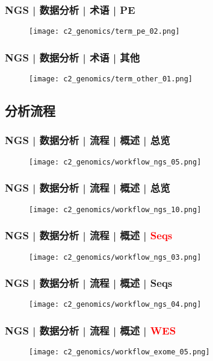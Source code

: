 \begin{frame}
  \frametitle{NGS | 数据分析 | 术语 | PE}
  \begin{figure}
    \centering
    \texttt{[image: c2\_genomics/term\_pe\_02.png]}
  \end{figure}
\end{frame}

\begin{frame}
  \frametitle{NGS | 数据分析 | 术语 | 其他}
  \begin{figure}
    \centering
    \texttt{[image: c2\_genomics/term\_other\_01.png]}
  \end{figure}
\end{frame}

\subsection{分析流程}
\begin{frame}
  \frametitle{NGS | 数据分析 | 流程 | 概述 | 总览}
  \begin{figure}
    \centering
    \texttt{[image: c2\_genomics/workflow\_ngs\_05.png]}
  \end{figure}
\end{frame}

\begin{frame}
  \frametitle{NGS | 数据分析 | 流程 | 概述 | 总览}
  \begin{figure}
    \centering
    \texttt{[image: c2\_genomics/workflow\_ngs\_10.png]}
  \end{figure}
\end{frame}

\begin{frame}
  \frametitle{NGS | 数据分析 | 流程 | 概述 | \textcolor{red}{Seqs}}
  \begin{figure}
    \centering
    \texttt{[image: c2\_genomics/workflow\_ngs\_03.png]}
  \end{figure}
\end{frame}

\begin{frame}
  \frametitle{NGS | 数据分析 | 流程 | 概述 | Seqs}
  \begin{figure}
    \centering
    \texttt{[image: c2\_genomics/workflow\_ngs\_04.png]}
  \end{figure}
\end{frame}

\begin{frame}
  \frametitle{NGS | 数据分析 | 流程 | 概述 | \textcolor{red}{WES}}
  \begin{figure}
    \centering
    \texttt{[image: c2\_genomics/workflow\_exome\_05.png]}
  \end{figure}
\end{frame}

